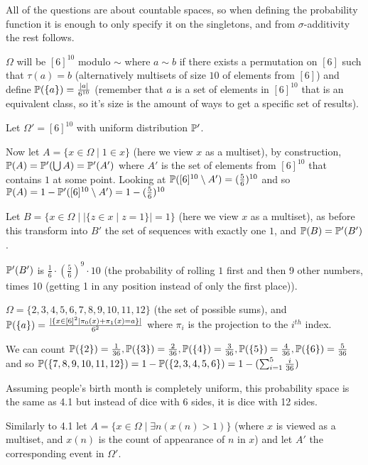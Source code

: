 \begin{cExercise}
	All of the questions are about countable spaces, so when defining the probability function it is enough to only specify it on the singletons, and from $\sigma$-additivity the rest follows.
	\begin{cPart}
		$\Omega$ will be $[6]^{10}$ modulo $\sim$ where $a\sim b$ if there exists a permutation on $[6]$ such that $\tau(a)=b$ (alternatively multisets of size $10$ of elements from $[6]$) and define $\P(\{a\})=\frac{|a|}{6^{10}}$ (remember that $a$ is a set of elements in $[6]^{10}$ that is an equivalent class, so it's size is the amount of ways to get a specific set of results).
		
		Let $\Omega'=[6]^{10}$ with uniform distribution $\P'$.
		
		Now let $A=\{x\in \Omega\mid 1\in x\}$ (here we view $x$ as a multiset), by construction, $\P(A)=\P'(\bigcup A)=\P'(A')$ where $A'$ is the set of elements from $[6]^{10}$ that contains $1$ at some point. Looking at $\P([6]^{10}\setminus A')=(\frac56)^{10}$ and so $\P(A)=1-\P'([6]^{10}\setminus A')=1-(\frac56)^{10}$
		
		Let $B=\{x\in \Omega\mid |\{z\in x\mid z=1\}|=1\}$ (here we view $x$ as a multiset), as before this transform into $B'$ the set of sequences with exactly one $1$, and $\P(B)=\P'(B')$.
		
		$\P'(B')$ is $\frac16\cdot\left(\frac56\right)^{9}\cdot 10$ (the probability of rolling $1$ first and then 9 other numbers, times 10 (getting 1 in any position instead of only the first place)).
	\end{cPart}
	\begin{cPart}
		$\Omega=\{2,3,4,5,6,7,8,9,10,11,12\}$ (the set of possible sums), and $\P(\{a\})=\frac{|\{x\in [6]^2\mid \pi_0(x)+\pi_1(x)=a\}|}{6^2}$ where $\pi_i$ is the projection to the $i^{th}$ index.
		
		We can count $\P(\{2\})=\frac1{36}, \P(\{3\})=\frac2{36}, \P(\{4\})=\frac3{36}, \P(\{5\})=\frac4{36}, \P(\{6\})=\frac5{36}$ and so $\P(\{7,8,9,10,11,12\})=1-\P(\{2,3,4,5,6\})=1-(\sum_{i=1}^5\frac i{36})$
	\end{cPart}
	\begin{cPart}
		Assuming people's birth month is completely uniform, this probability space is the same as 4.1 but instead of dice with 6 sides, it is dice with 12 sides.
		
		Similarly to 4.1 let $A=\{x\in\Omega\mid \exists n(x(n)>1)\}$ (where $x$ is viewed as a multiset, and $x(n)$ is the count of appearance of $n$ in $x$) and let $A'$ the corresponding event in $\Omega'$.
		

\end{cPart}
\end{cExercise}

